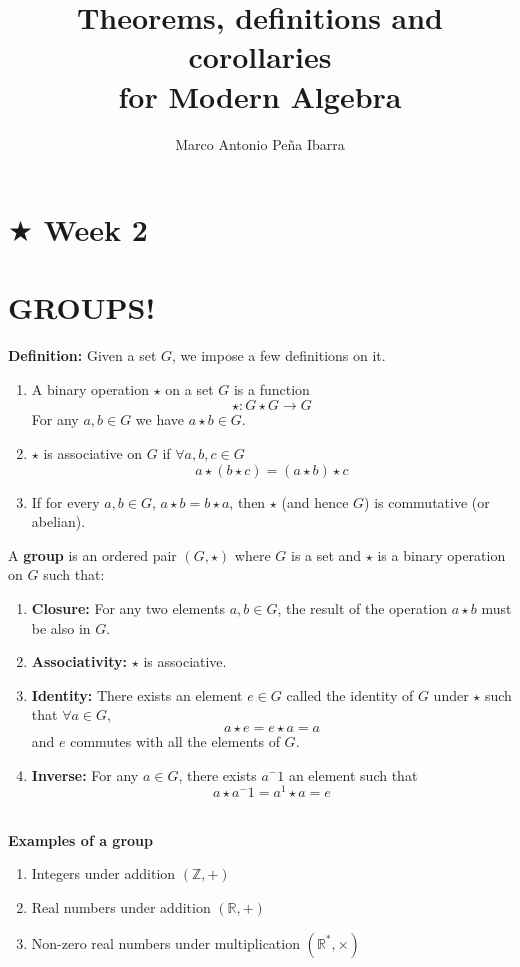\documentclass{article}
\title{Theorems, definitions and corollaries\\ for Modern Algebra}
\author{Marco Antonio Peña Ibarra}
\date{}
\begin{document}
\maketitle

\section*{$\bigstar$ Week 2}
\section*{GROUPS!}
\textbf{Definition:} Given a set \(G\), we impose a few definitions on it.
\begin{enumerate}
    \item A binary operation \(\star\) on a set \(G\) is a function 
    \[\star:G\star G \xrightarrow{}G\]
    For any \(a,b\in G\) we have \(a\star b \in G\).
    \item \(\star\) is associative on \(G\) if \(\forall a,b,c \in G\)
    \[a \star (b \star c)=(a \star b)\star c\]
    \item If for every \(a,b \in G\), \(a \star b=b \star a\), then \(\star\) (and hence \(G\)) is commutative (or abelian).\\[0.5cm]
\end{enumerate}

 A \textbf{group} is an ordered pair \((G,\star)\) where \(G\) is a set and \(\star\) is a binary operation on \(G\) such that:
\begin{enumerate}
    \item \textbf{Closure:} For any two elements \(a,b \in G\), the result of the operation \(a \star b\) must be also in \(G\).
    \item \textbf{Associativity:} \(\star\) is associative.
    \item \textbf{Identity:} There exists an element \(e\in G\) called the identity of \(G\) under \(\star\) such that \(\forall a \in G\), \[a \star e=e\star a=a\] and \(e\) commutes with all the elements of \(G\).
    \item \textbf{Inverse:} For any \(a\in G\), there exists \(a^-1\) an element such that \[a\star a^-1=a^1 \star a=e\]\\
\end{enumerate}

\centerline{\textbf{Examples of a group}}
\begin{enumerate}
    \item[] Integers under addition \((\mathbb{Z},+)\)
    \item[] Real numbers under addition \((\mathbb{R},+)\)
    \item[] Non-zero real numbers under multiplication \((\mathbb{R^*}, \times)\)
\end{enumerate}
\end{document}
